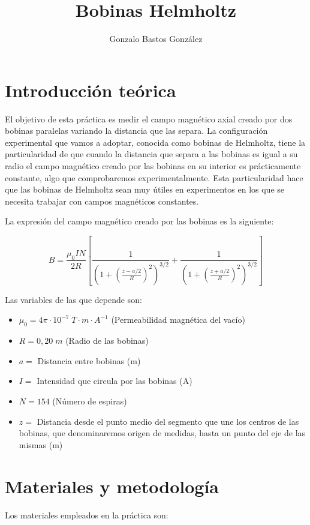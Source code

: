 \documentclass[a4paper,12pt,titlepage]{article}
\title{Bobinas Helmholtz}
\author{Gonzalo Bastos González}
\begin{document}
\section{Introducción teórica}

El objetivo de esta práctica es medir el campo magnético axial creado por dos bobinas paralelas variando la distancia que las separa. La configuración experimental que vamos a adoptar, conocida como bobinas de Helmholtz, tiene la particularidad de que cuando la distancia que separa a las bobinas es igual a su radio el campo magnético creado por las bobinas en su interior es prácticamente constante, algo que comprobaremos experimentalmente. Esta particularidad hace que las bobinas de Helmholtz sean muy útiles en experimentos en los que se necesita trabajar con campos magnéticos constantes.

\par La expresión del campo magnético creado por las bobinas es la siguiente:

\begin{equation}
    B=\frac{\mu_0 I N}{2 R}\left[\frac{1}{\left(1+\left(\frac{z-a / 2}{R}\right)^2\right)^{3 / 2}}+\frac{1}{\left(1+\left(\frac{z+a / 2}{R}\right)^2\right)^{3 / 2}}\right]
    \label{Campo magnético}
\end{equation}

Las variables de las que depende son:

\begin{itemize}
    \item $\mu_{0} = 4\pi \cdot 10^{-7} \; T\cdot m \cdot A^{-1}$ (Permeabilidad magnética del vacío)
    \item $R= 0,20 \; m$ (Radio de las bobinas)
    \item $a =$ Distancia entre bobinas (m)
    \item $I=$ Intensidad que circula por las bobinas (A)
    \item $N=154$ (Número de espiras)
    \item $z=$ Distancia desde el punto medio del segmento que une los centros de las bobinas, que denominaremos origen de medidas, hasta un punto del eje de las mismas (m)
\end{itemize}


\section{Materiales y metodología}

Los materiales empleados en la práctica son:
\end{document}

